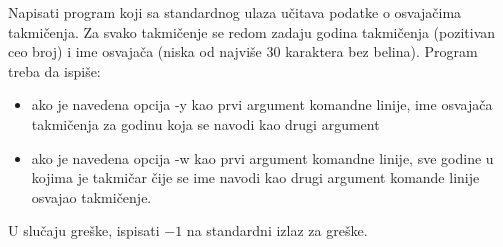 \begin{Exercise}[label=A_o_2_4] 
Napisati program koji sa standardnog ulaza učitava podatke o osvajačima takmičenja. Za svako takmičenje se redom zadaju godina takmičenja (pozitivan ceo broj) i ime osvajača (niska od najviše $30$ karaktera bez belina). Program treba da ispiše:
\begin{itemize}
\item ako je navedena opcija -y kao prvi argument komandne linije, ime osvajača takmičenja za godinu koja se navodi kao drugi argument
 \item ako je navedena opcija -w kao prvi argument komandne linije, sve godine u kojima je takmičar čije se ime navodi kao drugi argument komande linije osvajao takmičenje.
\end{itemize}

U slučaju greške, ispisati $-1$ na standardni izlaz za greške. \\

\\


\end{Exercise}
